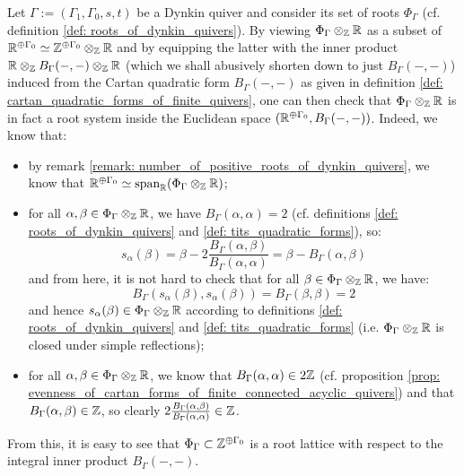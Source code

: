             \begin{example} \label{example: root_systems_of_dynkin_quivers}
                Let $\Gamma := (\Gamma_1, \Gamma_0, s, t)$ be a Dynkin quiver and consider its set of roots $\Phi_{\Gamma}$ (cf. definition \ref{def: roots_of_dynkin_quivers}). By viewing $\Phi_{\Gamma} \tensor_{\Z} \R$ as a subset of $\R^{\oplus \Gamma_0} \cong \Z^{\oplus \Gamma_0} \tensor_{\Z} \R$ and by equipping the latter with the inner product $\R \tensor_{\Z} B_{\Gamma}(-, -) \tensor_{\Z} \R$ (which we shall abusively shorten down to just $B_{\Gamma}(-, -)$) induced from the Cartan quadratic form $B_{\Gamma}(-, -)$ as given in definition \ref{def: cartan_quadratic_forms_of_finite_quivers}, one can then check that $\Phi_{\Gamma} \tensor_{\Z} \R$ is in fact a root system inside the Euclidean space $(\mathbb{R}^{\oplus \Gamma_0}, B_{\Gamma}(-, -))$. Indeed, we know that:
                    \begin{itemize}
                        \item by remark \ref{remark: number_of_positive_roots_of_dynkin_quivers}, we know that $\R^{\oplus \Gamma_0} \cong \span_{\R} (\Phi_{\Gamma} \tensor_{\Z} \R)$;
                        \item for all $\alpha, \beta \in \Phi_{\Gamma} \tensor_{\Z} \R$, we have $B_{\Gamma}(\alpha, \alpha) = 2$ (cf. definitions \ref{def: roots_of_dynkin_quivers} and \ref{def: tits_quadratic_forms}), so:
                            $$s_{\alpha}(\beta) = \beta - 2\frac{B_{\Gamma}(\alpha, \beta)}{B_{\Gamma}(\alpha, \alpha)} = \beta - B_{\Gamma}(\alpha, \beta)$$
                        and from here, it is not hard to check that for all $\beta \in \Phi_{\Gamma} \tensor_{\Z} \R$, we have:
                            $$B_{\Gamma}(s_{\alpha}(\beta), s_{\alpha}(\beta)) = B_{\Gamma}(\beta, \beta) = 2$$
                        and hence $s_{\alpha}(\beta) \in \Phi_{\Gamma} \tensor_{\Z} \R$ according to definitions \ref{def: roots_of_dynkin_quivers} and \ref{def: tits_quadratic_forms} (i.e. $\Phi_{\Gamma} \tensor_{\Z} \R$ is closed under simple reflections);
                        \item for all $\alpha, \beta \in \Phi_{\Gamma} \tensor_{\Z} \R$, we know that $B_{\Gamma}(\alpha, \alpha) \in 2\mathbb{Z}$ (cf. proposition \ref{prop: evenness_of_cartan_forms_of_finite_connected_acyclic_quivers}) and that $B_{\Gamma}(\alpha, \beta) \in \mathbb{Z}$, so clearly $2\frac{B_{\Gamma}(\alpha, \beta)}{B_{\Gamma}(\alpha, \alpha)} \in \mathbb{Z}$. 
                    \end{itemize}
                From this, it is easy to see that $\Phi_{\Gamma} \subset \mathbb{Z}^{\oplus \Gamma_0}$ is a root lattice with respect to the integral inner product $B_{\Gamma}(-, -)$.
            \end{example}
